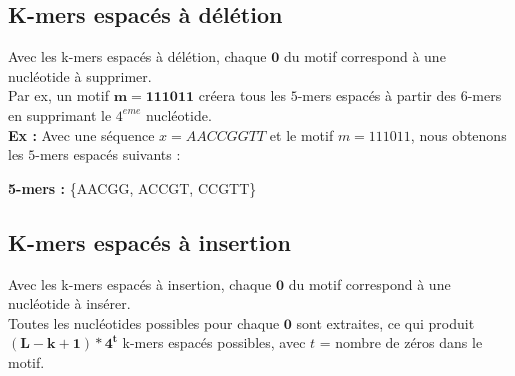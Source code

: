 \documentclass{report}
\begin{document}
      \subsection{K-mers espacés à délétion}
        Avec les k-mers espacés à délétion, chaque $\mathbf{0}$ du motif correspond à une nucléotide à supprimer.\\
        Par ex, un motif $\mathbf{m=111011}$ créera tous les $5$-mers espacés à partir des $6$-mers en supprimant le $4^{eme}$ nucléotide.\bigskip\\
        \textbf{Ex :} Avec une séquence $x = AACCGGTT$ et le motif $m = 111011$, nous obtenons les $5$-mers espacés suivants :\\
        \begin{center}\end{center}
        \textbf{5-mers :} \{AACGG, ACCGT, CCGTT\}
      \subsection{K-mers espacés à insertion}
        Avec les k-mers espacés à insertion, chaque $\mathbf{0}$ du motif correspond à une nucléotide à insérer.\\
        Toutes les nucléotides possibles pour chaque $\mathbf{0}$ sont extraites, ce qui produit $\mathbf{\left(L - k + 1 \right)*4^t}$ k-mers espacés possibles, avec $t$ = nombre de zéros dans le motif.\\
\end{document}
